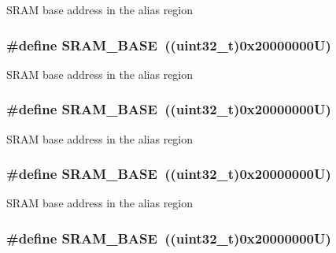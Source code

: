 S\-R\-A\-M base address in the alias region \hypertarget{group___peripheral__memory__map_ga05e8f3d2e5868754a7cd88614955aecc}{
\subsubsection[{S\-R\-A\-M\-\_\-\-B\-A\-S\-E}]{\setlength{\rightskip}{0pt plus 5cm}\#define S\-R\-A\-M\-\_\-\-B\-A\-S\-E~((uint32\-\_\-t)0x20000000\-U)}}\label{group___peripheral__memory__map_ga05e8f3d2e5868754a7cd88614955aecc}
S\-R\-A\-M base address in the alias region \hypertarget{group___peripheral__memory__map_ga05e8f3d2e5868754a7cd88614955aecc}{
\subsubsection[{S\-R\-A\-M\-\_\-\-B\-A\-S\-E}]{\setlength{\rightskip}{0pt plus 5cm}\#define S\-R\-A\-M\-\_\-\-B\-A\-S\-E~((uint32\-\_\-t)0x20000000\-U)}}\label{group___peripheral__memory__map_ga05e8f3d2e5868754a7cd88614955aecc}
S\-R\-A\-M base address in the alias region \hypertarget{group___peripheral__memory__map_ga05e8f3d2e5868754a7cd88614955aecc}{
\subsubsection[{S\-R\-A\-M\-\_\-\-B\-A\-S\-E}]{\setlength{\rightskip}{0pt plus 5cm}\#define S\-R\-A\-M\-\_\-\-B\-A\-S\-E~((uint32\-\_\-t)0x20000000\-U)}}\label{group___peripheral__memory__map_ga05e8f3d2e5868754a7cd88614955aecc}
S\-R\-A\-M base address in the alias region \hypertarget{group___peripheral__memory__map_ga05e8f3d2e5868754a7cd88614955aecc}{
\subsubsection[{S\-R\-A\-M\-\_\-\-B\-A\-S\-E}]{\setlength{\rightskip}{0pt plus 5cm}\#define S\-R\-A\-M\-\_\-\-B\-A\-S\-E~((uint32\-\_\-t)0x20000000\-U)}}\label{group___peripheral__memory__map_ga05e8f3d2e5868754a7cd88614955aecc}
